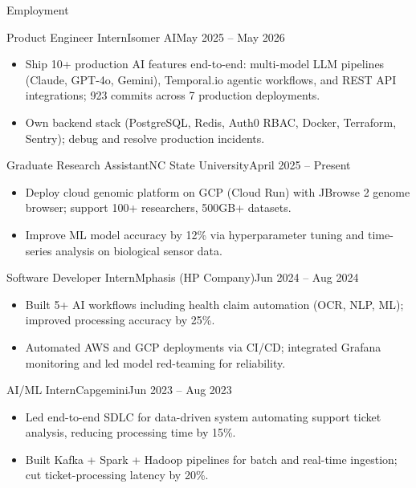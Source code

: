 \documentclass[]{mcdowellcv}
\begin{document}
\makeheader

\begin{cvsection}{Employment}
  \begin{cvsubsection}{Product Engineer Intern}{Isomer AI}{May 2025 -- May 2026}
    \begin{itemize}
      \item Ship 10+ production AI features end-to-end: multi-model LLM pipelines (Claude, GPT-4o, Gemini), Temporal.io agentic workflows, and REST API integrations; 923 commits across 7 production deployments.
      \item Own backend stack (PostgreSQL, Redis, Auth0 RBAC, Docker, Terraform, Sentry); debug and resolve production incidents.
    \end{itemize}
    \vspace{-1.5pt}
  \end{cvsubsection}

  \begin{cvsubsection}{Graduate Research Assistant}{NC State University}{April 2025 -- Present}
    \begin{itemize}
      \item Deploy cloud genomic platform on GCP (Cloud Run) with JBrowse 2 genome browser; support 100+ researchers, 500GB+ datasets.
      \item Improve ML model accuracy by 12\% via hyperparameter tuning and time-series analysis on biological sensor data.
    \end{itemize}
    \vspace{-1.5pt}
  \end{cvsubsection}

  \begin{cvsubsection}{Software Developer Intern}{Mphasis (HP Company)}{Jun 2024 -- Aug 2024}
    \begin{itemize}
      \item Built 5+ AI workflows including health claim automation (OCR, NLP, ML); improved processing accuracy by 25\%.
      \item Automated AWS and GCP deployments via CI/CD; integrated Grafana monitoring and led model red-teaming for reliability.
    \end{itemize}
    \vspace{-1.5pt}
  \end{cvsubsection}

  \begin{cvsubsection}{AI/ML Intern}{Capgemini}{Jun 2023 -- Aug 2023}
    \begin{itemize}
      \item Led end-to-end SDLC for data-driven system automating support ticket analysis, reducing processing time by 15\%.
      \item Built Kafka + Spark + Hadoop pipelines for batch and real-time ingestion; cut ticket-processing latency by 20\%.
    \end{itemize}
    \vspace{-1.5pt}
  \end{cvsubsection}
\end{cvsection}
\end{document}
